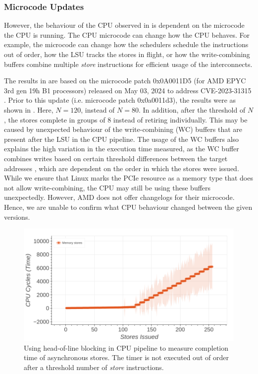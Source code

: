 \subsubsection{Microcode Updates}
\label{subsubsec:interconnect-sc-store-ops-challenges-microcode-updates}
However, the behaviour of the CPU observed in  is dependent on the microcode the CPU is running.
The CPU microcode can change how the CPU behaves.
For example, the microcode can change how the schedulers schedule the instructions out of order, how the LSU tracks the stores in flight, or how the write-combining buffers combine multiple \textit{store} instructions for efficient usage of the interconnects.

The results in  are based on the microcode patch 0x0A0011D5 (for AMD EPYC 3rd gen 19h B1 processors) released on May 03, 2024 to address CVE-2023-31315 \cite{amd_microcode_update}.
Prior to this update (i.e. microcode patch 0x0a0011d3), the results were as shown in .
Here, $N = 120$, instead of $N = 80$. 
In addition, after the threshold of $N$, the stores complete in groups of $8$ instead of retiring individually.
This may be caused by unexpected behaviour of the write-combining (WC) buffers that are present after the LSU in the CPU pipeline.
The usage of the WC buffers also explains the high variation in the execution time measured, as the WC buffer combines writes based on certain threshold differences between the target addresses \cite{amd_7003_software_optimization_guide}, which are dependent on the order in which the stores were issued.
While we ensure that Linux marks the PCIe resource as a memory type that does not allow write-combining, the CPU may still be using these buffers unexpectedly.
However, AMD does not offer changelogs for their microcode.
Hence, we are unable to confirm what CPU behaviour changed between the given versions.


\begin{figure}[!htb]
    \centering
    \includegraphics[width=\columnwidth]{figures/interconnect-sc/store-ops/measuring_store_time_before_microcode_update.png}
    \caption{Using head-of-line blocking in CPU pipeline to measure completion time of asynchronous stores.
    The timer is not executed out of order after a threshold number of \textit{store} instructions.}
    \label{fig:measuring-store-time-before-microcode-update}
\end{figure}

